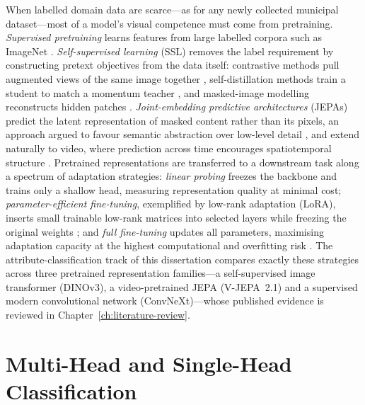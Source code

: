 When labelled domain data are scarce---as for any newly collected municipal dataset---most of a model's visual competence must come from pretraining. \emph{Supervised pretraining} learns features from large labelled corpora such as ImageNet \citep{deng2009imagenet,krizhevsky2012imagenet}. \emph{Self-supervised learning} (SSL) removes the label requirement by constructing pretext objectives from the data itself: contrastive methods pull augmented views of the same image together \citep{chen2020simple,he2020momentum}, self-distillation methods train a student to match a momentum teacher \citep{grill2020bootstrap,caron2021emerging}, and masked-image modelling reconstructs hidden patches \citep{he2022masked}. \emph{Joint-embedding predictive architectures} (JEPAs) predict the latent representation of masked content rather than its pixels, an approach argued to favour semantic abstraction over low-level detail \citep{lecun2022path,assran2023self}, and extend naturally to video, where prediction across time encourages spatiotemporal structure \citep{bardes2024revisiting}. Pretrained representations are transferred to a downstream task along a spectrum of adaptation strategies: \emph{linear probing} freezes the backbone and trains only a shallow head, measuring representation quality at minimal cost; \emph{parameter-efficient fine-tuning}, exemplified by low-rank adaptation (LoRA), inserts small trainable low-rank matrices into selected layers while freezing the original weights \citep{hu2022lora,houlsby2019parameter}; and \emph{full fine-tuning} updates all parameters, maximising adaptation capacity at the highest computational and overfitting risk \citep{yosinski2014transferable,kornblith2019better}. The attribute-classification track of this dissertation compares exactly these strategies across three pretrained representation families---a self-supervised image transformer (DINOv3), a video-pretrained JEPA (V-JEPA~2.1) and a supervised modern convolutional network (ConvNeXt)---whose published evidence is reviewed in Chapter~\ref{ch:literature-review}.

\section{Multi-Head and Single-Head Classification}
\label{sec:bg-multihead}

